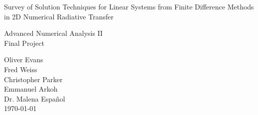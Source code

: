 \documentclass[10pt]{article}
\begin{document}
\null

\thispagestyle{empty}
\addtocounter{page}{-1}

\begin{center}
    \begin{sffamily}
    \begin{bfseries}
        \null
        \vfill
        \Huge{Survey of Solution Techniques for Linear Systems from Finite Difference Methods in 2D Numerical Radiative Transfer}

        \vspace{20pt}
		\LARGE{Advanced Numerical Analysis II} \\[.25em]
		\Large{Final Project} \\
        \vspace{20pt}
    \begin{Large}
        Oliver Evans \\
        Fred Weiss \\
        Christopher Parker \\
        Emmanuel Arkoh \\[1em]

        Dr. Malena Espa\~nol \\
    \vspace{20pt}
    \today
    \end{Large}
    \end{bfseries}
    \end{sffamily}
    \vspace{30pt}

    \null
    \vfill
    \vfill
    \null
\end{center}
\pagebreak


\renewcommand{\arraystretch}{1.5}
\end{document}
